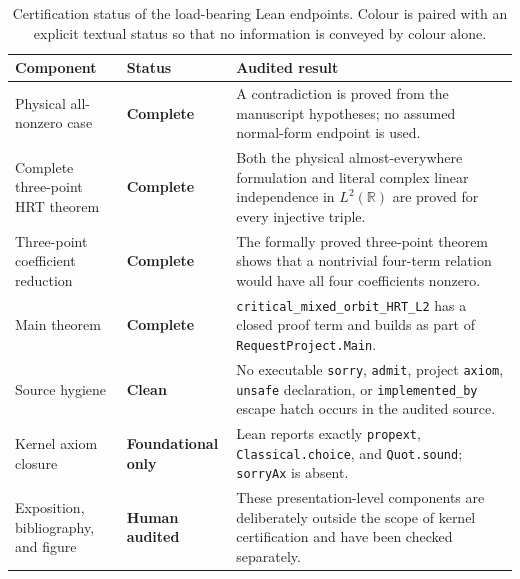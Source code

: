 \documentclass[reqno]{amsart}
\theoremstyle{remark}
\numberwithin{equation}{section}
\newcommand{\R}{\mathbb{R}}
\begin{document}
\begin{table}[htbp]
\centering
\caption{Certification status of the load-bearing Lean endpoints. Colour is
paired with an explicit textual status so that no information is conveyed by
colour alone.}
\label{tab:lean-status}
\small
\renewcommand{\arraystretch}{1.18}
\begin{tabularx}{0.98\textwidth}{
  >{\raggedright\arraybackslash}p{}
  >{\centering\arraybackslash}p{}
  >{\raggedright\arraybackslash}X}
\toprule
\rowcolor{HRTHeader}
\textbf{Component} & \textbf{Status} & \textbf{Audited result}\\
\midrule
Physical all-nonzero case
& \cellcolor{HRTPositive}\textbf{Complete}
& A contradiction is proved from the manuscript hypotheses; no assumed
normal-form endpoint is used.\\
Complete three-point HRT theorem
& \cellcolor{HRTPositive}\textbf{Complete}
& Both the physical almost-everywhere formulation and literal complex linear
independence in \(L^2(\R)\) are proved for every injective triple.\\
Three-point coefficient reduction
& \cellcolor{HRTPositive}\textbf{Complete}
& The formally proved three-point theorem shows that a nontrivial four-term
relation would have all four coefficients nonzero.\\
Main theorem
& \cellcolor{HRTPositive}\textbf{Complete}
& \nolinkurl{critical_mixed_orbit_HRT_L2} has a closed proof term and builds
as part of \nolinkurl{RequestProject.Main}.\\
Source hygiene
& \cellcolor{HRTPositive}\textbf{Clean}
& No executable \texttt{sorry}, \texttt{admit}, project \texttt{axiom},
\texttt{unsafe} declaration, or \nolinkurl{implemented_by} escape hatch occurs
in the audited source.\\
Kernel axiom closure
& \cellcolor{HRTPresent}\textbf{Foundational only}
& Lean reports exactly
\texttt{propext}, \texttt{Classical.choice}, and \texttt{Quot.sound};
\texttt{sorryAx} is absent.\\
Exposition, bibliography, and figure
& \cellcolor{HRTPartial}\textbf{Human audited}
& These presentation-level components are deliberately outside the scope of
kernel certification and have been checked separately.\\
\bottomrule
\end{tabularx}
\end{table}
\end{document}
